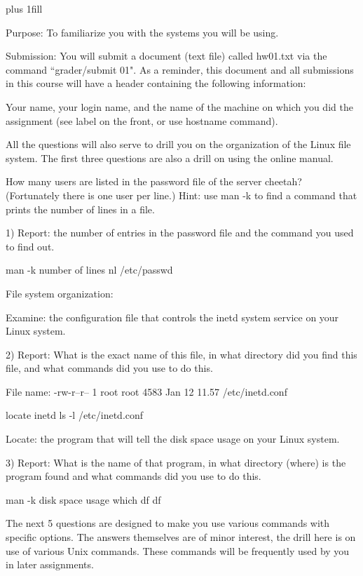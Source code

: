 
\rightskip=0pt plus 1fill

\parindent 0pt

Purpose:
To familiarize you with the systems you will be using.

Submission: You will submit a document (text file) called {\ltt{}hw01.txt} 
via the command ``\tilde grader/submit 01".
As a reminder, this document and all submissions in this course will 
have a header containing the following information:

Your name, your login name, and the name of the machine on which you
did the assignment (see label on the front, or use hostname command).

All the questions will also serve to drill you on the organization
of the Linux file system.
The first three questions are also a drill on using the online manual.

How many users are listed in the password file of the server cheetah?
(Fortunately there is one user per line.)
Hint: use {\ltt{}man -k} to find a command that prints the number
of lines in a file.

1) Report: the number of entries in the password file and
the command you used to find out.

man -k number of lines
nl /etc/passwd

File system organization:

Examine: the configuration file that controls the {\ltt{}inetd} system service
on your Linux system.

2) Report: 
What is the exact name of this file,
in what directory did you find this file,
and what commands did you use to do this.

File name: -rw-r--r-- 1 root root 4583 Jan 12 11.57 /etc/inetd.conf

locate inetd
ls -l /etc/inetd.conf

Locate: the program that will tell the disk space usage
on your Linux system.

3) Report: What is the name of that program,
in what directory (where) is the program found
and what commands did you use to do this.

man -k disk space usage
which df
df

The next 5 questions are designed to make you use various
commands with specific options.
The answers themselves are of minor interest, the drill here is
on use of various Unix commands.
These commands will be frequently used by you in later assignments.

